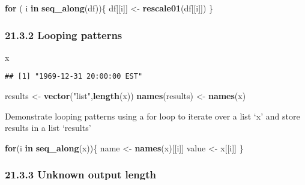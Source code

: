 \documentclass[
]{article}
\newenvironment{Shaded}{\begin{snugshade}}{\end{snugshade}}
\newcommand{\ControlFlowTok}[1]{\textcolor[rgb]{0.13,0.29,0.53}{\textbf{#1}}}
\newcommand{\FunctionTok}[1]{\textcolor[rgb]{0.13,0.29,0.53}{\textbf{#1}}}
\newcommand{\NormalTok}[1]{#1}
\newcommand{\OtherTok}[1]{\textcolor[rgb]{0.56,0.35,0.01}{#1}}
\newcommand{\StringTok}[1]{\textcolor[rgb]{0.31,0.60,0.02}{#1}}
\begin{document}
\begin{Shaded}
\begin{Highlighting}[]
\ControlFlowTok{for}\NormalTok{ ( i }\ControlFlowTok{in} \FunctionTok{seq\_along}\NormalTok{(df))\{}
\NormalTok{  df[[i]] }\OtherTok{\textless{}{-}} \FunctionTok{rescale01}\NormalTok{(df[[i]])}
\NormalTok{\}}
\end{Highlighting}
\end{Shaded}

\hypertarget{looping-patterns}{%
\subsubsection{21.3.2 Looping patterns}\label{looping-patterns}}

\begin{Shaded}
\begin{Highlighting}[]
\NormalTok{x}
\end{Highlighting}
\end{Shaded}

\begin{verbatim}
## [1] "1969-12-31 20:00:00 EST"
\end{verbatim}

\begin{Shaded}
\begin{Highlighting}[]
\NormalTok{results }\OtherTok{\textless{}{-}} \FunctionTok{vector}\NormalTok{(}\StringTok{"list"}\NormalTok{,}\FunctionTok{length}\NormalTok{(x))}
\FunctionTok{names}\NormalTok{(results) }\OtherTok{\textless{}{-}} \FunctionTok{names}\NormalTok{(x)}
\end{Highlighting}
\end{Shaded}

Demonstrate looping patterns using a for loop to iterate over a list `x'
and store results in a list `results'

\begin{Shaded}
\begin{Highlighting}[]
\ControlFlowTok{for}\NormalTok{(i }\ControlFlowTok{in} \FunctionTok{seq\_along}\NormalTok{(x))\{}
\NormalTok{  name }\OtherTok{\textless{}{-}} \FunctionTok{names}\NormalTok{(x)[[i]]}
\NormalTok{  value }\OtherTok{\textless{}{-}}\NormalTok{ x[[i]]}
\NormalTok{\}}
\end{Highlighting}
\end{Shaded}

\hypertarget{unknown-output-length}{%
\subsubsection{21.3.3 Unknown output
length}\label{unknown-output-length}}
\end{document}
